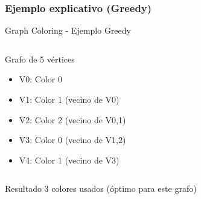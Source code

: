 \documentclass[aspectratio=169]{beamer}
\begin{document}
\subsubsection{Ejemplo explicativo (Greedy)}
\begin{frame}{Graph Coloring - Ejemplo Greedy}
\begin{columns}
\begin{column}{0.5\textwidth}
\begin{exampleblock}{Grafo de 5 vértices}
\begin{itemize}
\item V0: Color 0
\item V1: Color 1 (vecino de V0)
\item V2: Color 2 (vecino de V0,1)
\item V3: Color 0 (vecino de V1,2)
\item V4: Color 1 (vecino de V3)
\end{itemize}
\end{exampleblock}
\end{column}
\begin{column}{0.5\textwidth}
\end{column}
\end{columns}

\begin{block}{Resultado}
3 colores usados (óptimo para este grafo)
\end{block}
\end{frame}
\end{document}
